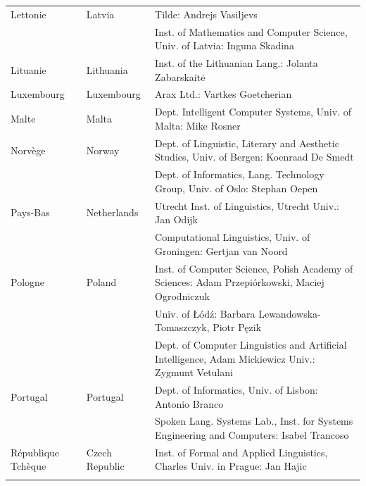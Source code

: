 \begin{longtable}{llp{105mm}}
  Lettonie & \textcolor{grey1}{Latvia} & Tilde: Andrejs Vasiljevs\\ \addlinespace 
  & & Inst. of Mathematics and Computer Science, Univ. of Latvia: Inguna Skadina\\ \addlinespace

  Lituanie & \textcolor{grey1}{Lithuania} & Inst. of the Lithuanian Lang.: Jolanta Zabarskaitė\\ \addlinespace

  Luxembourg & \textcolor{grey1}{Luxembourg} & Arax Ltd.: Vartkes Goetcherian\\ \addlinespace

  Malte & \textcolor{grey1}{Malta} & Dept. Intelligent Computer Systems, Univ. of Malta: Mike Rosner\\ \addlinespace

  Norvège & \textcolor{grey1}{Norway} & Dept. of Linguistic, Literary and Aesthetic Studies, Univ. of Bergen: Koenraad De Smedt\\ \addlinespace 
  & & Dept. of Informatics, Lang. Technology Group, Univ. of Oslo: Stephan Oepen \\ \addlinespace

  Pays-Bas & \textcolor{grey1}{Netherlands} & Utrecht Inst. of Linguistics, Utrecht Univ.: Jan Odijk\\ \addlinespace 
  & & Computational Linguistics, Univ. of Groningen: Gertjan van Noord\\ \addlinespace

  Pologne & \textcolor{grey1}{Poland} & Inst. of Computer Science, Polish Academy of Sciences: Adam Przepiórkowski, Maciej Ogrodniczuk \\ \addlinespace
  & & Univ. of Łódź: Barbara Lewandowska-Tomaszczyk, Piotr Pęzik\\ \addlinespace
  & & Dept. of Computer Linguistics and Artificial Intelligence, Adam Mickiewicz Univ.: Zygmunt Vetulani \\ \addlinespace

  Portugal & \textcolor{grey1}{Portugal} & Dept. of Informatics, Univ. of Lisbon: Antonio Branco\\ \addlinespace
  & & Spoken Lang. Systems Lab., Inst. for Systems Engineering and Computers: Isabel Trancoso \\ \addlinespace

  République Tchèque& \textcolor{grey1}{Czech Republic} & Inst. of Formal and Applied Linguistics, Charles Univ. in Prague: Jan Hajic \\ \addlinespace


\end{longtable}

